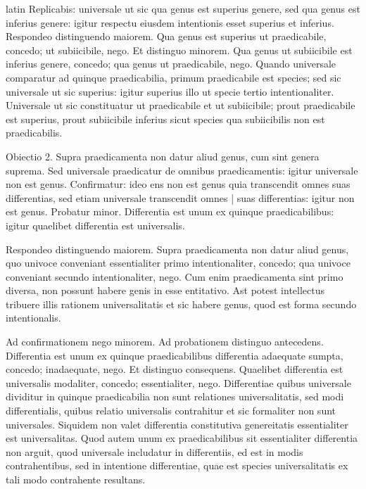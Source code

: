 \begin{otherlanguage*}{latin}
\pstart
Replicabis:
universale ut sic qua genus est superius genere, sed qua genus est inferius genere:
igitur respectu eiusdem intentionis esset superius et inferius. Respondeo distinguendo maiorem. Qua genus est superius ut praedicabile, concedo; ut subiicibile, nego. Et distinguo minorem. Qua genus ut subiicibile est inferius genere, concedo; qua genus ut praedicabile, nego. Quando universale comparatur ad quinque praedicabilia, primum praedicabile est species; sed sic universale ut sic superius:
igitur superius illo ut specie tertio intentionaliter. Universale ut sic constituatur ut praedicabile et ut subiicibile; prout praedicabile est superius, prout subiicibile inferius sicut species qua subiicibilis non est praedicabilis. 
\pend

\pstart
Obiectio 2. Supra praedicamenta non datur aliud genus, cum sint genera suprema. Sed universale praedicatur de omnibus praedicamentis:
igitur universale non est genus. Confirmatur:
ideo ens non est genus quia transcendit omnes suas differentias, sed etiam universale transcendit omnes \textnormal{|} suas differentias:
igitur non est genus. Probatur minor. Differentia est unum ex quinque praedicabilibus:
igitur quaelibet differentia est universalis. 
\pend

\pstart
Respondeo distinguendo maiorem. Supra praedicamenta non datur aliud genus, quo univoce conveniant essentialiter primo intentionaliter, concedo; qua univoce conveniant secundo intentionaliter, nego. Cum enim praedicamenta sint primo diversa, non possunt habere genis in esse entitativo. Ast potest intellectus tribuere illis rationem universalitatis et sic habere genus, quod est forma secundo intentionalis. 
\pend

\pstart
Ad confirmationem nego minorem. Ad probationem distinguo antecedens. Differentia est unum ex quinque praedicabilibus differentia adaequate sumpta, concedo; inadaequate, nego. Et distinguo consequens. Quaelibet differentia est universalis modaliter, concedo; essentialiter, nego. Differentiae quibus universale dividitur in quinque praedicabilia non sunt relationes universalitatis, sed modi differentialis, quibus relatio universalis contrahitur et sic formaliter non sunt universales. Siquidem non valet differentia constitutiva genereitatis essentialiter est universalitas. Quod autem unum ex praedicabilibus sit essentialiter differentia non arguit, quod universale includatur in differentiis, ed est in modis contrahentibus, sed in intentione differentiae, quae est species universalitatis ex tali modo contrahente resultans. 
\pend


\end{otherlanguage*}
